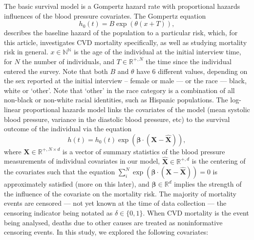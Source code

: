 \documentclass[
]{article}
\begin{document}
The basic survival model is a Gompertz hazard rate with proportional hazards influences of the blood pressure covariates.
The Gompertz equation
\begin{equation}\label{gompertz}
h_0(t)=B\exp{\left(\theta(x+T)\right)},
\end{equation}
describes the baseline hazard of the population to a particular risk, which, for this article, investigates CVD mortality specifically, as well as studying mortality risk in general. \(x\in\mathbb{N^N}\) is the age of the individual at the initial interview time, for \(N\) the number of individuals, and \(T\in\mathbb{R}^{+,N}\) the time since the individual entered the survey.
Note that both \(B\) and \(\theta\) have 6 different values, depending on the sex reported at the initial interview -- female or male --- or the race --- black, white or `other'.
Note that `other' in the race category is a combination of all non-black or non-white racial identities, such as Hispanic populations.
The log-linear proportional hazards model links the covariates of the model (mean systolic blood pressure, variance in the diastolic blood pressure, etc) to the survival outcome of the individual via the equation
\begin{equation}\label{prophaz}
h(t)=h_0(t)\exp{\left(\boldsymbol{\beta}\cdot(\boldsymbol{X}-\hat{\boldsymbol{X}})\right)},
\end{equation}
where \(\boldsymbol{X}\in\mathbb{R}^{+,N\times d}\) is a vector of summary statistics of the blood pressure measurements of individual covariates in our model, \(\hat{\boldsymbol{X}}\in\mathbb{R}^{+,d}\) is the centering of the covariates such that the equation \(\sum_i^N \exp{(\boldsymbol{\beta}\cdot(\boldsymbol{X}-\hat{\boldsymbol{X}}))}=0\) is approximately satisfied (more on this later), and \(\boldsymbol{\beta}\in\mathbb{R}^d\) implies the strength of the influence of the covariate on the mortality risk.
The majority of mortality events are censored --- not yet known at the time of data collection --- the censoring indicator being notated as \(\delta\in \{0,1\}\).
When CVD mortality is the event being analysed, deaths due to other causes are treated as noninformative censoring events.
In this study, we explored the following covariates:
\end{document}
